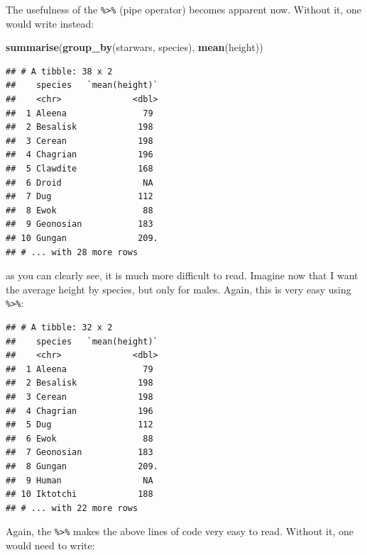 \documentclass[]{gitbook}
\newenvironment{Shaded}{\begin{snugshade}}{\end{snugshade}}
\newcommand{\KeywordTok}[1]{\textcolor[rgb]{0.13,0.29,0.53}{\textbf{#1}}}
\newcommand{\NormalTok}[1]{#1}
\newcommand{\OperatorTok}[1]{\textcolor[rgb]{0.81,0.36,0.00}{\textbf{#1}}}
\newcommand{\StringTok}[1]{\textcolor[rgb]{0.31,0.60,0.02}{#1}}
\theoremstyle{definition}
\theoremstyle{definition}
\theoremstyle{definition}
\theoremstyle{remark}
\begin{document}
The usefulness of the \texttt{\%\textgreater{}\%} (pipe operator)
becomes apparent now. Without it, one would write instead:

\begin{Shaded}
\begin{Highlighting}[]
\KeywordTok{summarise}\NormalTok{(}\KeywordTok{group_by}\NormalTok{(starwars, species), }\KeywordTok{mean}\NormalTok{(height))}
\end{Highlighting}
\end{Shaded}

\begin{verbatim}
## # A tibble: 38 x 2
##    species   `mean(height)`
##    <chr>              <dbl>
##  1 Aleena               79 
##  2 Besalisk            198 
##  3 Cerean              198 
##  4 Chagrian            196 
##  5 Clawdite            168 
##  6 Droid                NA 
##  7 Dug                 112 
##  8 Ewok                 88 
##  9 Geonosian           183 
## 10 Gungan              209.
## # ... with 28 more rows
\end{verbatim}

as you can clearly see, it is much more difficult to read. Imagine now
that I want the average height by species, but only for males. Again,
this is very easy using \texttt{\%\textgreater{}\%}:

\begin{Shaded}
\end{Shaded}

\begin{verbatim}
## # A tibble: 32 x 2
##    species   `mean(height)`
##    <chr>              <dbl>
##  1 Aleena               79 
##  2 Besalisk            198 
##  3 Cerean              198 
##  4 Chagrian            196 
##  5 Dug                 112 
##  6 Ewok                 88 
##  7 Geonosian           183 
##  8 Gungan              209.
##  9 Human                NA 
## 10 Iktotchi            188 
## # ... with 22 more rows
\end{verbatim}

Again, the \texttt{\%\textgreater{}\%} makes the above lines of code
very easy to read. Without it, one would need to write:
\end{document}
